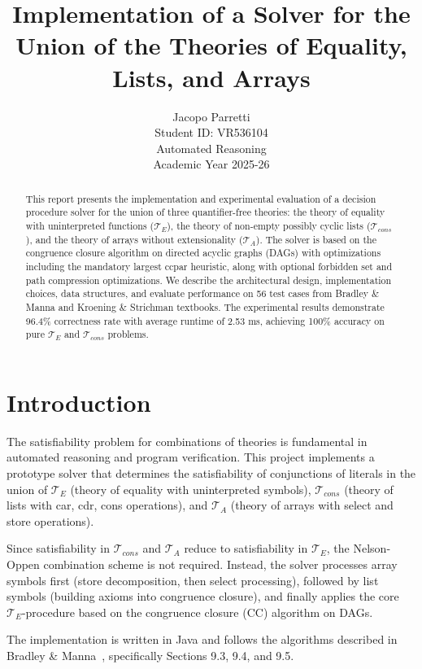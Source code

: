 \documentclass[11pt,a4paper]{article}
\title{\textbf{Implementation of a Solver for the Union of the Theories of Equality, Lists, and Arrays}}
\author{
    Jacopo Parretti \\
    Student ID: VR536104 \\
    Automated Reasoning \\
    Academic Year 2025-26
}
\date{}
\begin{document}
\maketitle

\begin{abstract}
This report presents the implementation and experimental evaluation of a decision procedure solver for the union of three quantifier-free theories: the theory of equality with uninterpreted functions ($\mathcal{T}_E$), the theory of non-empty possibly cyclic lists ($\mathcal{T}_{cons}$), and the theory of arrays without extensionality ($\mathcal{T}_A$). The solver is based on the congruence closure algorithm on directed acyclic graphs (DAGs) with optimizations including the mandatory largest ccpar heuristic, along with optional forbidden set and path compression optimizations. We describe the architectural design, implementation choices, data structures, and evaluate performance on 56 test cases from Bradley \& Manna and Kroening \& Strichman textbooks. The experimental results demonstrate 96.4\% correctness rate with average runtime of 2.53 ms, achieving 100\% accuracy on pure $\mathcal{T}_E$ and $\mathcal{T}_{cons}$ problems.
\end{abstract}

\section{Introduction}

The satisfiability problem for combinations of theories is fundamental in automated reasoning and program verification. This project implements a prototype solver that determines the satisfiability of conjunctions of literals in the union of $\mathcal{T}_E$ (theory of equality with uninterpreted symbols), $\mathcal{T}_{cons}$ (theory of lists with car, cdr, cons operations), and $\mathcal{T}_A$ (theory of arrays with select and store operations).

Since satisfiability in $\mathcal{T}_{cons}$ and $\mathcal{T}_A$ reduce to satisfiability in $\mathcal{T}_E$, the Nelson-Oppen combination scheme is not required. Instead, the solver processes array symbols first (store decomposition, then select processing), followed by list symbols (building axioms into congruence closure), and finally applies the core $\mathcal{T}_E$-procedure based on the congruence closure (CC) algorithm on DAGs.

The implementation is written in Java and follows the algorithms described in Bradley \& Manna~\cite{bradley2007calculus}, specifically Sections 9.3, 9.4, and 9.5.
\end{document}
